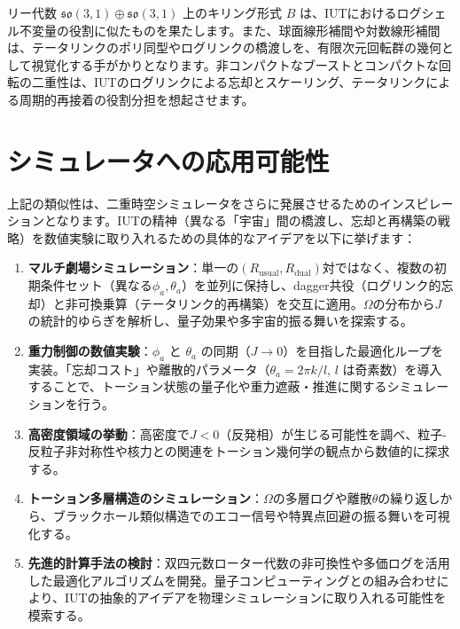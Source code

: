 \documentclass[a4paper,12pt,notitlepage]{jsreport}
\begin{document}
リー代数 $\mathfrak{so}(3,1) \oplus \mathfrak{so}(3,1)$ 上のキリング形式 $B$ は、IUTにおけるログシェル不変量の役割に似たものを果たします。また、球面線形補間や対数線形補間は、テータリンクのポリ同型やログリンクの橋渡しを、有限次元回転群の幾何として視覚化する手がかりとなります。非コンパクトなブーストとコンパクトな回転の二重性は、IUTのログリンクによる忘却とスケーリング、テータリンクによる周期的再接着の役割分担を想起させます。

\section{シミュレータへの応用可能性}

上記の類似性は、二重時空シミュレータをさらに発展させるためのインスピレーションとなります。IUTの精神（異なる「宇宙」間の橋渡し、忘却と再構築の戦略）を数値実験に取り入れるための具体的なアイデアを以下に挙げます：

\begin{enumerate}
\item \textbf{マルチ劇場シミュレーション}：単一の$(R_{\text{usual}}, R_{\text{dual}})$対ではなく、複数の初期条件セット（異なる$\phi_a, \theta_a$）を並列に保持し、dagger共役（ログリンク的忘却）と非可換乗算（テータリンク的再構築）を交互に適用。$\Omega$の分布から$J$の統計的ゆらぎを解析し、量子効果や多宇宙的振る舞いを探索する。

\item \textbf{重力制御の数値実験}：$\phi_a$ と $\theta_a$ の同期（$J \to 0$）を目指した最適化ループを実装。「忘却コスト」や離散的パラメータ（$\theta_a = 2\pi k / l$, $l$ は奇素数）を導入することで、トーション状態の量子化や重力遮蔽・推進に関するシミュレーションを行う。

\item \textbf{高密度領域の挙動}：高密度で$J<0$（反発相）が生じる可能性を調べ、粒子-反粒子非対称性や核力との関連をトーション幾何学の観点から数値的に探求する。

\item \textbf{トーション多層構造のシミュレーション}：$\Omega$の多層ログや離散$\theta$の繰り返しから、ブラックホール類似構造でのエコー信号や特異点回避の振る舞いを可視化する。

\item \textbf{先進的計算手法の検討}：双四元数ローター代数の非可換性や多価ログを活用した最適化アルゴリズムを開発。量子コンピューティングとの組み合わせにより、IUTの抽象的アイデアを物理シミュレーションに取り入れる可能性を模索する。
\end{enumerate}
\end{document}
